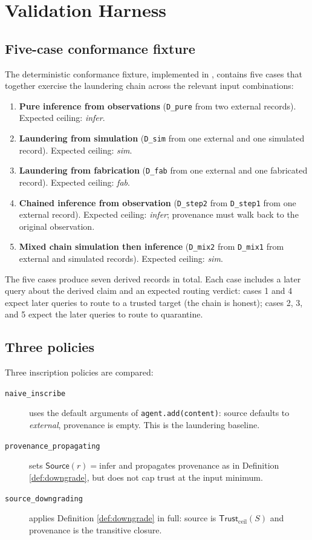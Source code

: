 \documentclass[11pt]{article}
\newcommand{\Source}{\mathsf{Source}}
\newcommand{\Trust}{\mathsf{Trust}}
\newcommand{\infer}{\ensuremath{\mathrm{infer}}}
\begin{document}
\section{Validation Harness}
\label{sec:harness}

\subsection{Five-case conformance fixture}

The deterministic conformance fixture, implemented in , contains five cases that together exercise the laundering chain across the relevant input combinations:

\begin{enumerate}
\item \textbf{Pure inference from observations} (\texttt{D\_pure} from two external records). Expected ceiling: \emph{infer}.
\item \textbf{Laundering from simulation} (\texttt{D\_sim} from one external and one simulated record). Expected ceiling: \emph{sim}.
\item \textbf{Laundering from fabrication} (\texttt{D\_fab} from one external and one fabricated record). Expected ceiling: \emph{fab}.
\item \textbf{Chained inference from observation} (\texttt{D\_step2} from \texttt{D\_step1} from one external record). Expected ceiling: \emph{infer}; provenance must walk back to the original observation.
\item \textbf{Mixed chain simulation then inference} (\texttt{D\_mix2} from \texttt{D\_mix1} from external and simulated records). Expected ceiling: \emph{sim}.
\end{enumerate}

The five cases produce seven derived records in total. Each case includes a later query about the derived claim and an expected routing verdict: cases 1 and 4 expect later queries to route to a trusted target (the chain is honest); cases 2, 3, and 5 expect the later queries to route to quarantine.

\subsection{Three policies}

Three inscription policies are compared:
\begin{description}
\item[\texttt{naive\_inscribe}] uses the default arguments of \texttt{agent.add(content)}: source defaults to \emph{external}, provenance is empty. This is the laundering baseline.
\item[\texttt{provenance\_propagating}] sets $\Source(r) = \infer$ and propagates provenance as in Definition \ref{def:downgrade}, but does not cap trust at the input minimum.
\item[\texttt{source\_downgrading}] applies Definition \ref{def:downgrade} in full: source is $\Trust_{\text{ceil}}(S)$ and provenance is the transitive closure.
\end{description}
\end{document}
